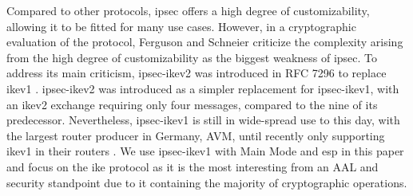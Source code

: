 Compared to other protocols, \ac{ipsec} offers a high degree of customizability, allowing it to be fitted for many use cases. However, in a cryptographic evaluation of the protocol, Ferguson and Schneier \cite{ferguson1999cryptographic} criticize the complexity arising from the high degree of customizability as the biggest weakness of \ac{ipsec}. To address its main criticism, \ac{ipsec}-\ac{ike}v2 was introduced in RFC 7296 to replace \ac{ike}v1 \cite{kaufman2014internet}. \ac{ipsec}-\ac{ike}v2 was introduced as a simpler replacement for \ac{ipsec}-\ac{ike}v1, with an \ac{ike}v2 exchange requiring only four messages, compared to the nine of its predecessor. Nevertheless, \ac{ipsec}-\ac{ike}v1 is still in wide-spread use to this day, with the largest router producer in Germany, AVM, until recently only supporting \ac{ike}v1 in their routers \cite{avm2022}. We use \ac{ipsec}-\ac{ike}v1 with Main Mode and \ac{esp} in this paper and focus on the \ac{ike} protocol as it is the most interesting from an AAL and security standpoint due to it containing the majority of cryptographic operations.
